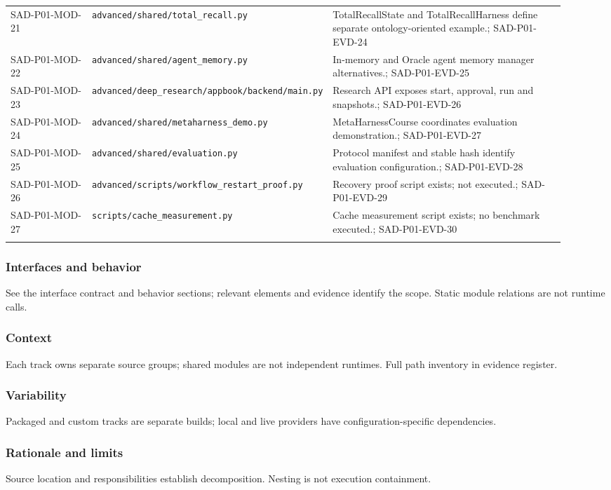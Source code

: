\documentclass[10pt,letterpaper]{article}
\begin{document}
\begin{longtable}{@{}>{\raggedright\arraybackslash}p{0.15\linewidth}>{\raggedright\arraybackslash}p{0.34\linewidth}>{\raggedright\arraybackslash}p{0.43\linewidth}@{}}
SAD-P01-MOD-21 & \nolinkurl{advanced/shared/total_recall.py} & TotalRecallState and TotalRecallHarness define separate ontology-oriented example.; SAD-P01-EVD-24\\\addlinespace
SAD-P01-MOD-22 & \nolinkurl{advanced/shared/agent_memory.py} & In-memory and Oracle agent memory manager alternatives.; SAD-P01-EVD-25\\\addlinespace
SAD-P01-MOD-23 & \nolinkurl{advanced/deep_research/appbook/backend/main.py} & Research API exposes start, approval, run and snapshots.; SAD-P01-EVD-26\\\addlinespace
SAD-P01-MOD-24 & \nolinkurl{advanced/shared/metaharness_demo.py} & MetaHarnessCourse coordinates evaluation demonstration.; SAD-P01-EVD-27\\\addlinespace
SAD-P01-MOD-25 & \nolinkurl{advanced/shared/evaluation.py} & Protocol manifest and stable hash identify evaluation configuration.; SAD-P01-EVD-28\\\addlinespace
SAD-P01-MOD-26 & \nolinkurl{advanced/scripts/workflow_restart_proof.py} & Recovery proof script exists; not executed.; SAD-P01-EVD-29\\\addlinespace
SAD-P01-MOD-27 & \nolinkurl{scripts/cache_measurement.py} & Cache measurement script exists; no benchmark executed.; SAD-P01-EVD-30\\\addlinespace
\bottomrule\end{longtable}

\subsubsection{Interfaces and behavior}
See the interface contract and behavior sections; relevant elements and evidence identify the scope. Static module relations are not runtime calls.
\subsubsection{Context}
Each track owns separate source groups; shared modules are not independent runtimes. Full path inventory in evidence register.
\subsubsection{Variability}
Packaged and custom tracks are separate builds; local and live providers have configuration-specific dependencies.
\subsubsection{Rationale and limits}
Source location and responsibilities establish decomposition. Nesting is not execution containment.
\end{document}
